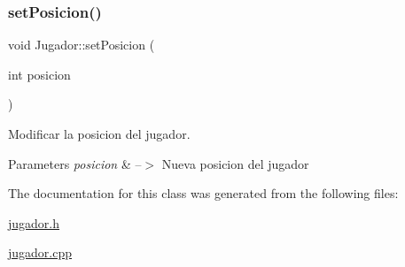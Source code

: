 \subsubsection{\texorpdfstring{set\+Posicion()}{setPosicion()}}
{\footnotesize\ttfamily void Jugador\+::set\+Posicion (\begin{DoxyParamCaption}\item[{int}]{posicion }\end{DoxyParamCaption})}



Modificar la posicion del jugador. 


\begin{DoxyParams}{Parameters}
{\em posicion} & --$>$ Nueva posicion del jugador \\
\hline
\end{DoxyParams}


The documentation for this class was generated from the following files\+:\begin{DoxyCompactItemize}
\item 
\mbox{\hyperlink{jugador_8h}{jugador.\+h}}\item 
\mbox{\hyperlink{jugador_8cpp}{jugador.\+cpp}}\end{DoxyCompactItemize}
